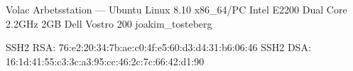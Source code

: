 \documentclass[a5paper]{article}
\begin{document}
   \computerdescription
       {Volac}
       {Arbetsstation}
       {---}
       {Ubuntu Linux 8.10}
       {x86\_64/PC}
       {Intel E2200 Dual Core 2.2GHz}
       {2GB}
       {Dell Vostro 200}
       {joakim\_tosteberg}



   \sshfingerprintheading
   \begin{sshfingerprint}
SSH2 RSA: 76:e2:20:34:7b:ae:c0:4f:e5:60:d3:d4:31:b6:06:46
SSH2 DSA: 16:1d:41:55:c3:3c:a3:95:cc:46:2c:7c:66:42:d1:90
   \end{sshfingerprint}
\end{document}
